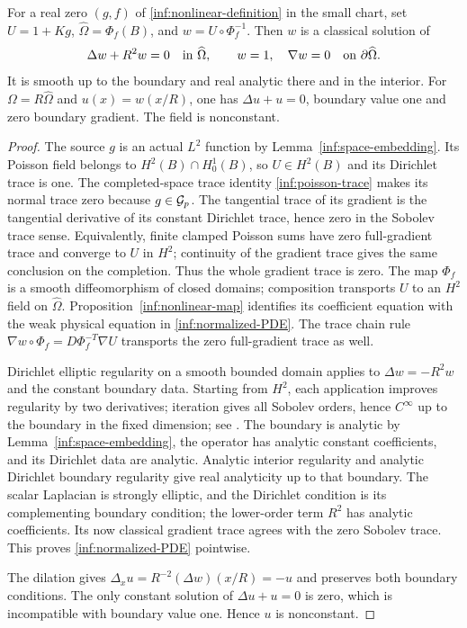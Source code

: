 \begin{proposition}
\label{inf:classical-solution}
For a real zero $(g,f)$ of \eqref{inf:nonlinear-definition} in the
small chart, set $U=1+Kg$, $\widehat\Omega=\Phi_f(B)$, and
$w=U\circ\Phi_f^{-1}$. Then $w$ is a classical solution of
\begin{equation}\label{inf:normalized-PDE}
 \Delta w+R^2w=0\quad\hbox{in }\widehat\Omega,
 \qquad w=1,\quad\nabla w=0\quad\hbox{on }\partial\widehat\Omega.
\end{equation}
It is smooth up to the boundary and real analytic there and in
the interior. For $\Omega=R\widehat\Omega$ and $u(x)=w(x/R)$,
one has $\Delta u+u=0$, boundary value one and zero boundary
gradient. The field is nonconstant.
\end{proposition}
\begin{proof}
The source $g$ is an actual $L^2$ function by
Lemma~\ref{inf:space-embedding}. Its Poisson field belongs to
$H^2(B)\cap H^1_0(B)$, so $U\in H^2(B)$ and its Dirichlet
trace is one. The completed-space trace identity
\eqref{inf:poisson-trace} makes its normal trace zero because
$g\in\mathcal{G}_p$.
The tangential trace of its gradient is the tangential derivative
of its constant Dirichlet trace, hence zero in the Sobolev trace
sense. Equivalently, finite clamped Poisson sums have zero full-gradient
trace and converge to $U$ in $H^2$; continuity of the gradient
trace gives the same conclusion on the completion. Thus the
whole gradient trace is zero.
The map $\Phi_f$ is a smooth diffeomorphism of closed domains;
composition transports $U$ to an $H^2$ field on
$\widehat\Omega$. Proposition~\ref{inf:nonlinear-map} identifies
its coefficient equation with the weak physical equation in
\eqref{inf:normalized-PDE}.
The trace chain rule
$\nabla w\circ\Phi_f=D\Phi_f^{-T}\nabla U$ transports the zero
full-gradient trace as well.

Dirichlet elliptic regularity on a smooth bounded domain applies
to $\Delta w=-R^2w$ and the constant boundary data. Starting from
$H^2$, each application improves regularity by two derivatives;
iteration gives all Sobolev orders, hence $C^\infty$ up to the
boundary in the fixed dimension; see \cite[Chs.~6, 8, 9]{inf:GT}.
The boundary is analytic by Lemma~\ref{inf:space-embedding}, the
operator has analytic constant coefficients, and its Dirichlet
data are analytic. Analytic interior regularity \cite{inf:MorreyNirenberg} and
analytic Dirichlet boundary regularity \cite{inf:MorreyBoundary}
give real analyticity up to that boundary. The scalar Laplacian
is strongly elliptic, and the Dirichlet condition is its
complementing boundary condition; the lower-order term $R^2$
has analytic coefficients. Its now classical gradient trace agrees with the zero
Sobolev trace. This proves \eqref{inf:normalized-PDE} pointwise.

The dilation gives
$\Delta_xu=R^{-2}(\Delta w)(x/R)=-u$ and preserves both boundary
conditions. The only constant solution of $\Delta u+u=0$ is zero,
which is incompatible with boundary value one. Hence $u$ is
nonconstant.
\end{proof}


